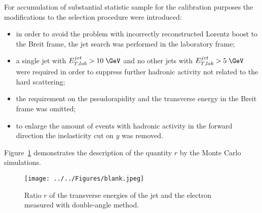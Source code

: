 For accumulation of substantial statistic sample for the calibration purposes the modifications to the selection procedure were introduced:
\begin{itemize}
	\item in order to avoid the problem with incorrectly reconstructed Lorentz boost to the Breit frame, the jet search was performed in the laboratory frame;
	\item a single jet with $\etjetlab > 10\; \GeV$ and no other jets with $\etjetlab > 5\; \GeV$ were required in order to suppress further hadronic activity not related to the hard scattering;
	\item the requirement on the pseudorapidity and the transverse energy in the Breit frame was omitted;
	\item to enlarge the amount of events with hadronic activity in the forward direction the inelasticity cut on $y$ was removed.
\end{itemize}

Figure~\ref{fig:ratcalibcontrolplot} demonstrates the description of the quantity $r$ by the Monte Carlo simulations.
\begin{figure}[htbp]
	\centering
		\texttt{[image: ../../Figures/blank.jpeg]} 
	\caption{Ratio $r$ of the transverse energies of the jet and the electron measured with double-angle method.}
	\label{fig:ratcalibcontrolplot}
\end{figure}

